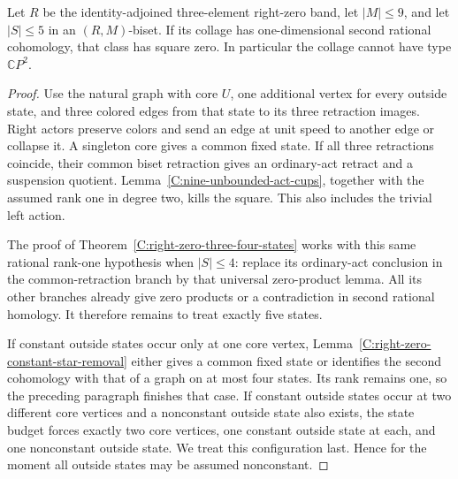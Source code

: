 \begin{theorem}
\label{C:right-zero-three-five-small-sources}
Let $R$ be the identity-adjoined three-element right-zero band,
let $|M|\leq9$, and let $|S|\leq5$ in an $(R,M)$-biset.
If its collage has one-dimensional second rational cohomology,
that class has square zero. In particular the collage cannot
have type $\mathbb CP^2$.
\end{theorem}
\begin{proof}
Use the natural graph with core $U$, one additional vertex
for every outside state, and three colored edges from that
state to its three retraction images. Right actors preserve
colors and send an edge at unit speed to another edge or
collapse it. A singleton core gives a common fixed state.
If all three retractions coincide, their common biset
retraction gives an ordinary-act retract and a suspension
quotient. Lemma~\ref{C:nine-unbounded-act-cups}, together
with the assumed rank one in degree two, kills the square.
This also includes the trivial left action.

The proof of Theorem~\ref{C:right-zero-three-four-states}
works with this same rational rank-one hypothesis when
$|S|\leq4$: replace its ordinary-act conclusion in the
common-retraction branch by that universal zero-product
lemma. All its other branches already give zero products
or a contradiction in second rational homology.
It therefore remains to treat exactly five states.

If constant outside states occur only at one core vertex,
Lemma~\ref{C:right-zero-constant-star-removal} either gives
a common fixed state or identifies the second cohomology
with that of a graph on at most four states. Its rank remains
one, so the preceding
paragraph finishes that case. If constant outside states
occur at two different core vertices and a nonconstant
outside state also exists, the state budget forces exactly
two core vertices, one constant outside state at each, and
one nonconstant outside state. We treat this configuration
last. Hence for the moment all outside states may be
assumed nonconstant.


\end{proof}
